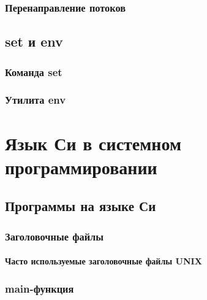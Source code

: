 \documentclass[oneside]{book}
\begin{document}
			\section{Перенаправление потоков}
			
			
		\chapter{set и env}
		
		
			\section{Команда set}
			
		
			\section{Утилита env}
			
			
			
			

\part{Язык Си в системном программировании}
%

	\chapter{Программы на языке Си}
	
	
		\section{Заголовочные файлы}
		
		
			\subsection{Часто используемые заголовочные файлы UNIX}
			
	
		\section{main-функция}
		
		
\end{document}
